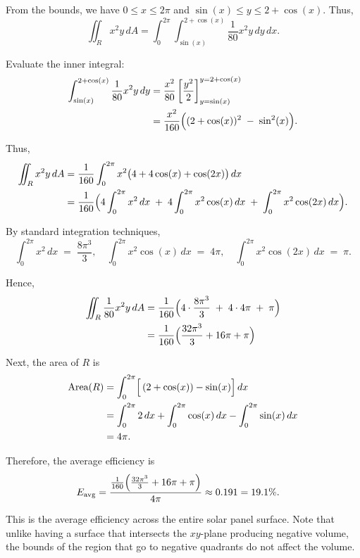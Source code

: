 \begin{example}
\begin{solution}
\noindent From the bounds, we have $0 \le x \le 2\pi$ and $\sin(x) \le y \le 2 + \cos(x)$. Thus,
\[
\iint_R x^2y \, dA
= \int_{0}^{2\pi} \int_{\sin(x)}^{2+\cos(x)}  \frac{1}{80} x^2y \, dy \, dx.
\]

\noindent Evaluate the inner integral:
\begin{align*}
\int_{\sin(x)}^{2+\cos(x)} \frac{1}{80} x^2y \, dy 
&= \frac{x^2}{80} \left[ \frac{y^2}{2} \right]_{y=\sin(x)}^{y=2 + \cos(x)} \\
&= \frac{x^2}{160} \Bigl( (2 + \cos(x))^2 \;-\; \sin^2(x) \Bigr).
\end{align*}

\noindent Thus,
\begin{align*}
\iint_R x^2y \, dA
&= \frac{1}{160} \int_{0}^{2\pi} x^2 \bigl( 4 + 4\cos(x) + \cos(2x) \bigr) \, dx \\
&= \frac{1}{160} \Bigl(
4 \int_{0}^{2\pi} x^2 \, dx
\;+\;
4 \int_{0}^{2\pi} x^2 \cos(x) \, dx
\;+\;
\int_{0}^{2\pi} x^2 \cos(2x) \, dx
\Bigr).
\end{align*}

\noindent By standard integration techniques,
\[
\int_{0}^{2\pi} x^2 \, dx \;=\; \frac{8\pi^3}{3},
\quad
\int_{0}^{2\pi} x^2 \cos(x) \, dx \;=\; 4\pi,
\quad
\int_{0}^{2\pi} x^2 \cos(2x) \, dx \;=\; \pi.
\]

\noindent Hence,
\begin{align*}
\iint_R \frac{1}{80} x^2 y \, dA
&= \frac{1}{160}
\Bigl( 4\cdot\frac{8\pi^3}{3} \;+\; 4\cdot 4\pi \;+\; \pi \Bigr) \\
&= \frac{1}{160}
\Bigl( \frac{32\pi^3}{3} + 16\pi + \pi \Bigr)
\end{align*}

\noindent Next, the area of $R$ is
\begin{align*}
\text{Area}(R)
&= \int_{0}^{2\pi} \Bigl[\, (2 + \cos(x)) - \sin(x) \Bigr] \, dx \\
&= \int_{0}^{2\pi} 2\,dx + \int_{0}^{2\pi} \cos(x)\,dx - \int_{0}^{2\pi} \sin(x)\,dx \\
&= 4\pi.
\end{align*}

\noindent Therefore, the average efficiency is
\begin{align*}
E_{\text{avg}}
&= \frac{\frac{1}{160}
\Bigl( \frac{32\pi^3}{3} + 16\pi + \pi \Bigr)}{4\pi} \approx 0.191 = 19.1 \%.
\end{align*}

\noindent This is the average efficiency across the entire solar panel surface. Note that unlike having a surface that intersects the $xy$-plane producing negative volume, the bounds of the region that go to negative quadrants do not affect the volume.
\end{solution}
\end{example}
\exampleline

